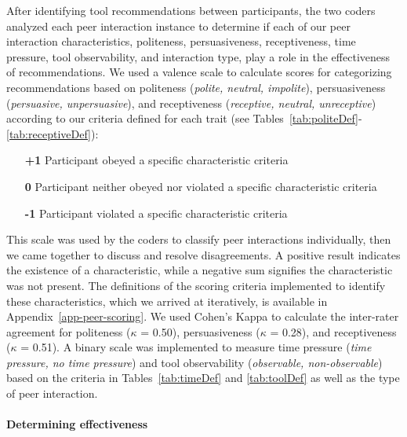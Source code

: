 After identifying tool recommendations between participants, the two coders analyzed each peer interaction instance to determine if each of our peer interaction characteristics, politeness, persuasiveness, receptiveness, time pressure, tool observability, and interaction type, play a role in the effectiveness of recommendations. We used a valence scale to calculate scores for categorizing recommendations based on politeness (\textit{polite, neutral, impolite}), persuasiveness (\textit{persuasive, unpersuasive}), and receptiveness (\textit{receptive, neutral, unreceptive}) according to our criteria defined for each trait (see Tables~\ref{tab:politeDef}-\ref{tab:receptiveDef}):

\begin{itemize}[topsep=0pt,itemsep=-1ex,partopsep=1ex,parsep=1ex]
    \item[\textbf{+1}] Participant obeyed a specific characteristic criteria
    \item[\textbf{0}] Participant neither obeyed nor violated a specific characteristic criteria
    \item[\textbf{-1}] Participant violated a specific characteristic criteria
\end{itemize}

This scale was used by the coders to classify peer interactions individually, then we came together to discuss and resolve disagreements. A positive result indicates the existence of a characteristic, while a negative sum signifies the characteristic was not present. The definitions of the scoring criteria implemented to identify these characteristics, which we arrived at iteratively, is available in Appendix~\ref{app-peer-scoring}. We used Cohen's Kappa to calculate the inter-rater agreement for politeness ($\kappa$ = 0.50), persuasiveness ($\kappa$ = 0.28), and 
receptiveness ($\kappa$ = 0.51). A binary scale was implemented to measure time pressure (\textit{time pressure, no time pressure}) and tool observability (\textit{observable, non-observable}) based on the criteria in Tables~\ref{tab:timeDef} and \ref{tab:toolDef} as well as the type of peer interaction. 

\paragraph*{Determining effectiveness}

